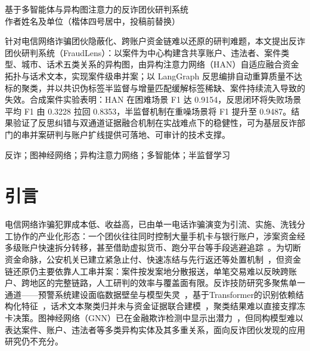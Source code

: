 \documentclass[12pt,a4paper,fontset=windows]{ctexart}
\begin{document}
\begin{center}
  {\heiti{} 基于多智能体与异构图注意力的反诈团伙研判系统}\\[6pt]
  {\kaishu{} 作者姓名及单位（楷体四号居中，投稿前替换）}
\end{center}
\vspace{4pt}

{\setlength{\baselineskip}{28pt}%
针对电信网络诈骗团伙隐蔽化、跨账户资金链难以还原的研判难题，本文提出反诈团伙研判系统（FraudLens）：以案件为中心构建含共享账户、违法者、案件类型、城市、话术五类关系的异构图，由异构注意力网络（HAN）自适应融合资金拓扑与话术文本，实现案件级串并案；以 LangGraph 反思编排自动重算质量不达标的聚类，并以共识伪标签半监督与增量匹配缓解标签稀缺、案件持续流入导致的失效。合成案件实验表明：HAN 在困难场景 F1 达 0.9154，反思闭环将失败场景平均 F1 由 0.3228 拉回 0.8353，半监督机制在重噪场景将 F1 提升至 0.9487。结果验证了反思纠错与双通道证据融合机制在实战难点下的稳健性，可为基层反诈部门的串并案研判与账户扩线提供可落地、可审计的技术支撑。\par

反诈；图神经网络；异构注意力网络；多智能体；半监督学习\par}

\section*{引言}

电信网络诈骗犯罪成本低、收益高，已由单一电话诈骗演变为引流、实施、洗钱分工协作的产业化形态：一个团伙往往同时控制大量手机卡与银行账户，涉案资金经多级账户快速拆分转移，甚至借助虚拟货币、跑分平台等手段逃避追踪~\cite{zheng2024crypto}。为切断资金命脉，公安机关已建立紧急止付、快速冻结与先行返还等处置机制~\cite{hu2025funds}，但资金链还原仍主要依靠人工串并案：案件按发案地分散报送，单笔交易难以反映跨账户、跨地区的完整链路，人工研判的效率与覆盖面有限。反诈技防研究多聚焦单一通道——预警系统建设面临数据壁垒与模型失灵~\cite{zhuang2025warning}，基于Transformer的识别依赖结构化特征~\cite{deng2024transformer}，话术文本聚类归并未与资金证据联合建模~\cite{shi2025llmsemantic}，聚类结果难以直接支撑冻卡决策。图神经网络（GNN）已在金融欺诈检测中显示出潜力~\cite{song2024survey,wu2023moneylaunder}，但同构模型难以表达案件、账户、违法者等多类异构实体及其多重关系，面向反诈团伙发现的应用研究仍不充分。
\end{document}
